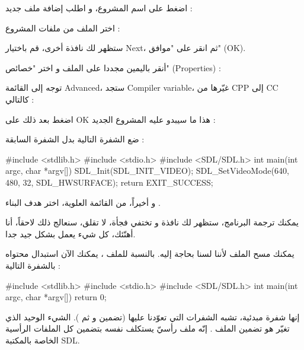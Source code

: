 \begin{tcolorbox}[breakable,title=ملاحظات مترجمة الكتاب,colback=orange!20,colframe=orange!70,fontupper=\footnotesize,coltitle=white,fonttitle=\large]
اضغط على اسم المشروع، و اطلب إضافة ملف جديد :


اختر الملف
من ملفات المشروع :


ستظهر لك نافذة أخرى، قم باختيار
\textenglish{Next}،
ثم انقر على "موافق"
(\textenglish{OK}).


أنقر باليمين مجددا على الملف 
و اختر "خصائص" 
(\textenglish{Properties}) :


توجه إلى القائمة
\textenglish{Advanced}،
ستجد
\textenglish{Compiler variable}،
غيّرها من
\textenglish{CPP}
إلى
\textenglish{CC}
كالتالي :


اضغط بعد ذلك على
\textenglish{OK}
هذا ما سيبدو عليه المشروع الجديد :

ضع الشفرة التالية بدل الشفرة السابقة :

\begin{Csource}
#include <stdlib.h> 
#include <stdio.h> 
#include <SDL/SDL.h>
int main(int argc, char *argv[]) 
{ 
	SDL_Init(SDL_INIT_VIDEO); 
	SDL_SetVideoMode(640, 480, 32, SDL_HWSURFACE); 
	return EXIT_SUCCESS; 
}
\end{Csource}

و أخيراً، من القائمة العلوية، اختر هدف البناء 
.


يمكنك ترجمة البرنامج، ستظهر لك نافذة و تختفي فجأة، لا تقلق، سنعالج ذلك لاحقاً، أنا أهنّئك، كل شيء يعمل بشكل جيد جدا.

\end{tcolorbox}

يمكنك مسح الملف 
لأننا لسنا بحاجة إليه. بالنسبة للملف 
، 
يمكنك الآن استبدال محتواه بالشفرة التالية :

\begin{Csource}
#include <stdlib.h>
#include <stdio.h>
#include <SDL/SDL.h>
int main(int argc, char *argv[])
{
	return 0;
}
\end{Csource}
إنها شفرة مبدئية، تشبه الشفرات التي تعوّدنا عليها (تضمين
و
ثم 
).
الشيء الوحيد الذي تغيّر هو تضمين الملف
.
إنّه ملف رأسيّ يستكلف نفسه بتضمين كل الملفات الرأسية الخاصة بالمكتبة 
\textenglish{SDL}.

